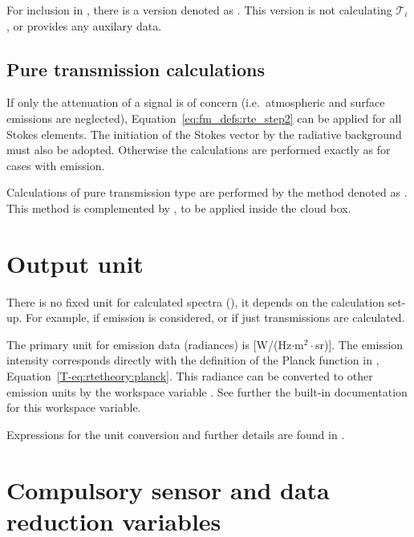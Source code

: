 For inclusion in , there is a version
denoted as . This version is not
calculating $\mathcal{T}_i$, or provides any auxilary data.


\subsection{Pure transmission calculations}
\label{sec:fm_defs:transmission}

If only the attenuation of a signal is of concern (i.e.\ atmospheric and
surface emissions are neglected), Equation~\ref{eq:fm_defs:rte_step2} can be
applied for all Stokes elements. The initiation of the Stokes vector by the
radiative background must also be adopted. Otherwise the calculations are
performed exactly as for cases with emission.

Calculations of pure transmission type are performed by the method denoted as
. This method is complemented by
, to be applied inside the cloud box.


\section{Output unit}
\label{sec:fm_defs:unit}

There is no fixed unit for calculated spectra (), it depends on the
calculation set-up. For example, if emission is considered, or if just
transmissions are calculated. 

The primary unit for emission data (radiances) is [W/(Hz$\cdot$m$^2\cdot$sr)].
The emission intensity corresponds directly with the definition of the Planck
function in \theory, Equation~\ref{T-eq:rtetheory:planck}. This radiance can be
converted to other emission units by the workspace variable .
See further the built-in documentation for this workspace variable.

Expressions for the unit conversion and further details are found in
\citet{eriksson:arts2:11}.



\section{Compulsory sensor and data reduction variables}
\label{sec:fm_defs:sensor1}

